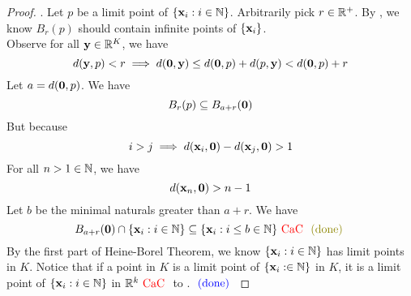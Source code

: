 \documentclass{report}
\begin{document}
\begin{proof}
. Let $p$ be a limit point of $\{ \textbf{x}_i:i \in\mathbb{N} \}$. Arbitrarily pick $r\in\mathbb{R}^+$. By , we know $B_r(p)$ should contain infinite points of $\{ \textbf{x}_i \}$.\\

Observe for all $\textbf{y}\in\mathbb{R}^K$, we have
\begin{equation}
d(\textbf{y},p)<r\implies d(\textbf{0},\textbf{y})\leq d(\textbf{0},p)+d(p,\textbf{y})<d(\textbf{0},p)+r
\end{equation}
Let $a=d(\textbf{0},p)$. We have
\begin{equation}
B_r(p)\subseteq B_{a+r}(\textbf{0})
\end{equation}
But because 
\begin{equation}
i>j\implies d(\textbf{x}_i,\textbf{0})-d(\textbf{x}_j,\textbf{0})>1
\end{equation}
For all $n>1\in\mathbb{N}$, we have
\begin{equation}
d(\textbf{x}_n,\textbf{0})>n-1
\end{equation}
Let $b$ be the minimal naturals greater than  $a+r$. We have
\begin{equation}
B_{a+r}(\vecta{0})\cap \set{\vecta{x}_i:i\inn}\subseteq \set{\vecta{x}_i:i\leq b\inn}\tCaC\odone
\end{equation}
By the first part of Heine-Borel Theorem, we know $\{ \textbf{x}_i:i\in\mathbb{N} \}$ has limit points in $K$. Notice that if a point in  $K$ is a limit point of $\{ \textbf{x}_i:\in\mathbb{N} \}$ in $K$, it is a limit point of $\{ \textbf{x}_i:i\in\mathbb{N} \}$ in $\mathbb{R}^k\text{ \textcolor{red}{CaC} }$ to . $\textcolor{blue}{\text{ (done) }}$ 
\end{proof}
\end{document}
